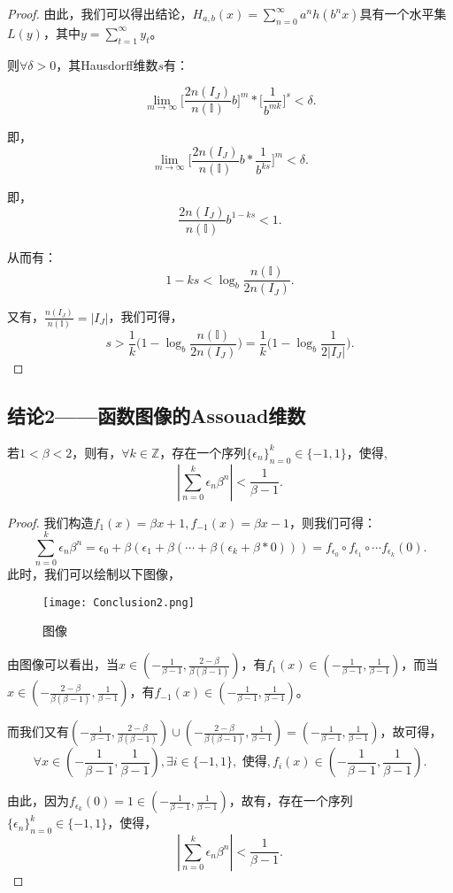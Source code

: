 \begin{proof}
由此，我们可以得出结论，$H_{a,b}(x)=\sum_{n=0}^\infty a^nh(b^nx)$具有一个水平集$L(y)$，其中$y=\sum_{t=1}^\infty y_t$。

则$\forall \delta>0$，其Hausdorff维数$s$有：

$$
      \lim_{m\rightarrow\infty}\Big[\frac{2n(I_J)}{n(\mathbb{I})}b\Big]^m*\Big[\frac{1}{b^{mk}}\Big]^s<\delta.
$$

即，
$$
      \lim_{m\rightarrow\infty}\Big[\frac{2n(I_J)}{n(\mathbb{I})}b*\frac{1}{b^{ks}}\Big]^m<\delta.
$$

即，
$$
      \frac{2n(I_J)}{n(\mathbb{I})}b^{1-ks}<1.
$$

从而有：
$$
      1-ks<\log_b\frac{n(\mathbb{I})}{2n(I_J)}.
$$

又有，$\frac{n(I_J)}{n(\mathbb{I})}=|I_J|$，我们可得，
$$
      s>\frac{1}{k}\Big(1-\log_b\frac{n(\mathbb{I})}{2n(I_J)}\Big)=\frac{1}{k}\Big(1-\log_b\frac{1}{2|I_J|}\Big).
$$

\end{proof}

\subsection{结论2——函数图像的Assouad维数}

\begin{lemma}
      若$1<\beta<2$，则有，$\forall k\in\mathbb{Z}$，存在一个序列$\{\epsilon_n\}_{n=0}^k\in\{-1,1\}$，使得,
      $$
            |\sum_{n=0}^k\epsilon_n\beta^n|<\frac{1}{\beta-1}.
      $$
\end{lemma}

\begin{proof}
      我们构造$f_1(x)=\beta x+1,f_{-1}(x)=\beta x -1$，则我们可得：
      $$
            \sum_{n=0}^k\epsilon_n\beta^n=\epsilon_0+\beta(\epsilon_1+\beta(\cdots+\beta(\epsilon_k+\beta*0)))=f_{\epsilon_0}\circ f_{\epsilon_1}\circ \cdots f_{\epsilon_k}(0).
      $$
      此时，我们可以绘制以下图像，
      \begin{figure*}[htbp]
            \centering
            \texttt{[image: Conclusion2.png]}
            \caption{图像}
            \label{fig:C1onclusion2}
      \end{figure*}

      由图像可以看出，当$x\in(-\frac{1}{\beta-1},\frac{2-\beta}{\beta(\beta-1)})$，有$f_1(x)\in(-\frac{1}{\beta-1},\frac{1}{\beta-1})$，而当$x\in(-\frac{2-\beta}{\beta(\beta-1)},\frac{1}{\beta-1})$，有$f_{-1}(x)\in(-\frac{1}{\beta-1},\frac{1}{\beta-1})$。

      而我们又有$(-\frac{1}{\beta-1},\frac{2-\beta}{\beta(\beta-1)})\cup(-\frac{2-\beta}{\beta(\beta-1)},\frac{1}{\beta-1})=(-\frac{1}{\beta-1},\frac{1}{\beta-1})$，故可得，
      $$
            \forall x\in(-\frac{1}{\beta-1},\frac{1}{\beta-1}), \exists i\in\{-1,1\},\mbox{ 使得},f_i(x)\in(-\frac{1}{\beta-1},\frac{1}{\beta-1}).
      $$

      由此，因为$f_{\epsilon_k}(0)=1\in(-\frac{1}{\beta-1},\frac{1}{\beta-1})$，故有，存在一个序列$\{\epsilon_n\}_{n=0}^{k}\in\{-1,1\}$，使得，
      $$
            |\sum_{n=0}^k\epsilon_n\beta^n|<\frac{1}{\beta-1}.
      $$
\end{proof}

